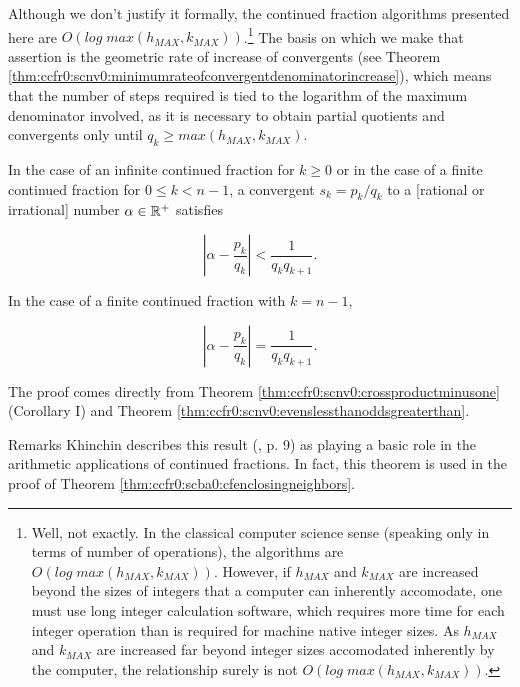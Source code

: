 Although we don't justify it formally,
the continued fraction algorithms presented here are 
$O(log \; max(h_{MAX}, k_{MAX}))$.\footnote{Well,
not exactly.  In the classical computer science
sense (speaking only in terms of number of operations),
the algorithms are $O(log \; max(h_{MAX}, k_{MAX}))$.  However,
if $h_{MAX}$ and $k_{MAX}$ are increased beyond the sizes
of integers that a computer can inherently accomodate, one must
use long integer calculation software, which requires more time for
each integer operation than is required for machine native
integer sizes.  As $h_{MAX}$ and $k_{MAX}$ are increased far
beyond integer sizes accomodated inherently by the computer, 
the relationship surely is not $O(log \; max(h_{MAX}, k_{MAX}))$.}  
The basis on which we
make that assertion is the geometric rate of 
increase of convergents (see Theorem 
\ref{thm:ccfr0:scnv0:minimumrateofconvergentdenominatorincrease}),
which means that the number of steps required is tied to the
logarithm of the maximum denominator involved, as it is 
necessary to obtain partial quotients and convergents only until
$q_k \geq max(h_{MAX},k_{MAX})$.

\begin{vworktheoremstatement}
\label{thm:ccfr0:scba0:convergentcloseness}
In the case of an infinite continued fraction for $k \geq 0$ or in the
case of a finite continued fraction for $0 \leq k < n-1$, a convergent
$s_k = p_k/q_k$ to a [rational or irrational] number 
$\alpha \in {\mathbb{R}^+}$ satisfies

\begin{equation}
\left| {\alpha - \frac{p_k}{q_k}} \right|
<
\frac{1}{q_k q_{k+1}} .
\end{equation}

In the case of a finite continued fraction with $k = n-1$,

\begin{equation}
\left| {\alpha - \frac{p_k}{q_k}} \right|
=
\frac{1}{q_k q_{k+1}} .
\end{equation}
\end{vworktheoremstatement}
\begin{vworktheoremproof}
The proof comes directly from Theorem
\ref{thm:ccfr0:scnv0:crossproductminusone} (Corollary I)
and Theorem
\ref{thm:ccfr0:scnv0:evenslessthanoddsgreaterthan}.
\end{vworktheoremproof}
\begin{vworktheoremparsection}{Remarks}
Khinchin describes this result (\cite{bibref:b:KhinchinClassic}, p. 9)
as playing a basic role in the arithmetic
applications of continued fractions.  In fact, this theorem is used
in the proof of Theorem
\ref{thm:ccfr0:scba0:cfenclosingneighbors}.
\end{vworktheoremparsection}
\vworktheoremfooter{}


